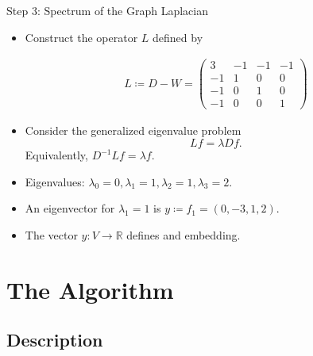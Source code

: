 \documentclass[11pt]{beamer}
\begin{document}
\begin{frame}{Step 3: Spectrum of the Graph Laplacian}
\begin{itemize}
\item Construct the operator $L$ defined by

\begin{align*}
L \coloneqq D - W  = \left(
\begin{array}{cccc}
 3 & -1 & -1 & -1 \\
 -1 & 1 & 0 & 0 \\
 -1 & 0 & 1 & 0 \\
 -1 & 0 & 0 & 1 
\end{array}
\right)
\end{align*}

\item Consider the generalized eigenvalue problem 
$$Lf = \lambda D f.$$
Equivalently, $D^{-1}Lf = \lambda f$. 
\pause
\item Eigenvalues: $\lambda_0 =0 , \lambda_1 =1, \lambda_2 = 1, \lambda_3 =2$.
\pause
\item An eigenvector for $\lambda_1 = 1$ is $y\coloneqq f_1 = (0,-3,1,2)$. 
\pause
\item The vector $y:V\longrightarrow\mathbb{R}$ defines and embedding.
\begin{figure}[h]
\begin{center}
\end{center}
\end{figure}
\end{itemize}
\end{frame}

\section{The Algorithm}

\subsection{Description}
\end{document}
